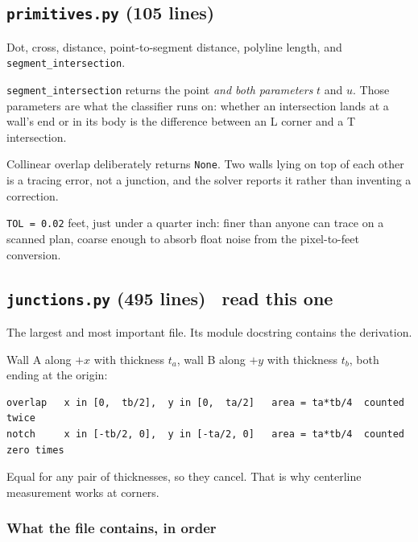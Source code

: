 \documentclass[11pt,letterpaper]{article}
\newcommand{\code}[1]{\texttt{\small #1}}
\begin{document}
\subsection{\texttt{primitives.py} (105 lines)}

Dot, cross, distance, point-to-segment distance, polyline length, and
\code{segment\_intersection}.

\code{segment\_intersection} returns the point \emph{and both parameters}
$t$ and $u$. Those parameters are what the classifier runs on: whether an
intersection lands at a wall's end or in its body is the difference between
an L corner and a T intersection.

Collinear overlap deliberately returns \code{None}. Two walls lying on top
of each other is a tracing error, not a junction, and the solver reports it
rather than inventing a correction.

\code{TOL = 0.02} feet, just under a quarter inch: finer than anyone can
trace on a scanned plan, coarse enough to absorb float noise from the
pixel-to-feet conversion.

\subsection{\texttt{junctions.py} (495 lines) \textendash\ read this one}

The largest and most important file. Its module docstring contains the
derivation.

Wall A along $+x$ with thickness $t_a$, wall B along $+y$ with thickness
$t_b$, both ending at the origin:

\begin{lstlisting}[language=none]
overlap   x in [0,  tb/2],  y in [0,  ta/2]   area = ta*tb/4  counted twice
notch     x in [-tb/2, 0],  y in [-ta/2, 0]   area = ta*tb/4  counted zero times
\end{lstlisting}

Equal for any pair of thicknesses, so they cancel. That is why centerline
measurement works at corners.

\subsubsection{What the file contains, in order}
\end{document}
